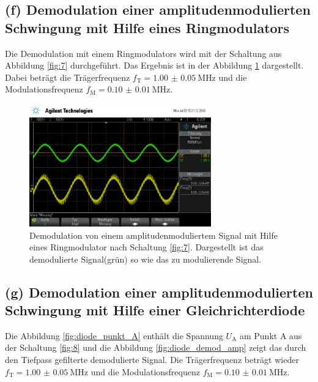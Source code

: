 \FloatBarrier
\subsection{(f) Demodulation einer amplitudenmodulierten Schwingung
mit Hilfe eines Ringmodulators}
\label{subsubsec:auswertung_f}
Die Demodulation mit einem Ringmodulators wird mit der Schaltung
aus Abbildung \ref{fig:7} durchgeführt. Das Ergebnis ist
in der Abbildung \ref{fig:amp_demod_ring} dargestellt.
Dabei beträgt die Trägerfrequenz $f_{\text{T}}=\SI{1.00(5)}{\mega\hertz}$
und die Modulationsfrequenz $f_{\text{M}}=\SI{0.10(1)}{\mega\hertz}$.


\begin{figure}
  \centering
  \includegraphics[width=0.7\textwidth]{osci/amp_demod.png}
  \caption{Demodulation von einem amplitudenmoduliertem Signal mit Hilfe eines
  Ringmodulator nach Schaltung \ref{fig:7}. Dargestellt ist das demodulierte Signal(grün) so wie das zu modulierende Signal.}
  \label{fig:amp_demod_ring}
\end{figure}




\FloatBarrier
\subsection{(g) Demodulation einer amplitudenmodulierten Schwingung
mit Hilfe einer Gleichrichterdiode}
\label{subsubsec:auswertung_g}
Die Abbildung \ref{fig:diode_punkt_A} enthält
die Spannung $U_{\text{A}}$ am Punkt A aus der
Schaltung \ref{fig:8} und die Abbildung \ref{fig:diode_demod_amp}
zeigt das durch den Tiefpass gefilterte demodulierte Signal.
Die Trägerfrequenz beträgt wieder $f_{\text{T}}=\SI{1.00(5)}{\mega\hertz}$
und die Modulationsfrequenz $f_{\text{M}}=\SI{0.10(1)}{\mega\hertz}$.


